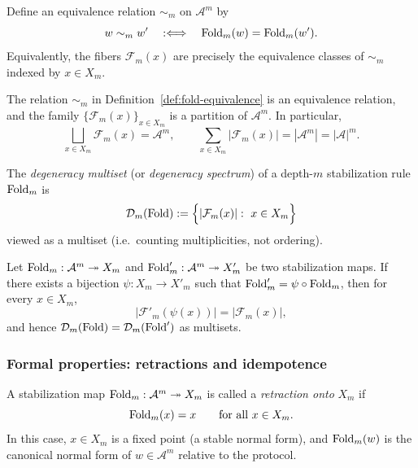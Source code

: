 \begin{definition}\label{def:fold-equivalence}
Define an equivalence relation $\sim_m$ on $\mathcal{A}^m$ by
\[
w\sim_m w' \quad:\Longleftrightarrow\quad \mathrm{Fold}_m(w)=\mathrm{Fold}_m(w').
\]
Equivalently, the fibers $\mathcal{F}_m(x)$ are precisely the equivalence classes of $\sim_m$ indexed by $x\in X_m$.
\end{definition}

\begin{proposition}\label{prop:fiber-partition}
The relation $\sim_m$ in Definition~\ref{def:fold-equivalence} is an equivalence relation, and the family $\{\mathcal{F}_m(x)\}_{x\in X_m}$ is a partition of $\mathcal{A}^m$. In particular,
\[
\bigsqcup_{x\in X_m}\mathcal{F}_m(x)=\mathcal{A}^m,
\qquad
\sum_{x\in X_m}|\mathcal{F}_m(x)|=|\mathcal{A}^m|=|\mathcal{A}|^m.
\]
\end{proposition}

\begin{definition}\label{def:degeneracy-multiset}
The \emph{degeneracy multiset} (or \emph{degeneracy spectrum}) of a depth-$m$ stabilization rule $\mathrm{Fold}_m$ is
\[
\mathcal{D}_m(\Fold):=\Bigl\{|\mathcal{F}_m(x)|:\ x\in X_m\Bigr\}
\]
viewed as a multiset (i.e.\ counting multiplicities, not ordering).
\end{definition}

\begin{proposition}\label{prop:degeneracy-relabel}
Let $\mathrm{Fold}_m:\mathcal{A}^m\twoheadrightarrow X_m$ and $\mathrm{Fold}'_m:\mathcal{A}^m\twoheadrightarrow X'_m$ be two stabilization maps. If there exists a bijection $\psi:X_m\to X'_m$ such that $\mathrm{Fold}'_m=\psi\circ \mathrm{Fold}_m$, then for every $x\in X_m$,
\[
|\mathcal{F}'_m(\psi(x))|=|\mathcal{F}_m(x)|,
\]
and hence $\mathcal{D}_m(\mathrm{Fold})=\mathcal{D}_m(\mathrm{Fold}')$ as multisets.
\end{proposition}

\subsubsection{Formal properties: retractions and idempotence}

\begin{definition}\label{def:fold-retraction}
A stabilization map $\mathrm{Fold}_m:\mathcal{A}^m\twoheadrightarrow X_m$ is called a \emph{retraction onto} $X_m$ if
\[
\mathrm{Fold}_m(x)=x\qquad\text{for all }x\in X_m.
\]
In this case, $x\in X_m$ is a fixed point (a stable normal form), and $\mathrm{Fold}_m(w)$ is the canonical normal form of $w\in\mathcal{A}^m$ relative to the protocol.
\end{definition}

